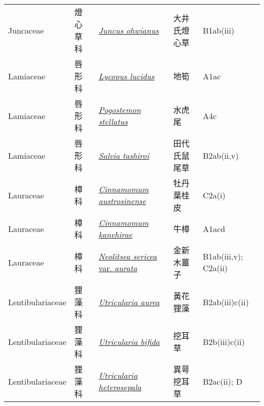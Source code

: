 {\begin{longtable}{p{2.5cm}p{2.5cm}p{4.5cm}p{2.5cm}p{3cm}}
    Juncaceae & 燈心草科 & \href{http://www.theplantlist.org/tpl1.1/search?q=Juncus+ohwianus}{\textit{Juncus ohwianus} } & 大井氏燈心草 & B1ab(iii) \index{Juncus@\textit{Juncus}!ohwianus@\textit{ohwianus}}  \index{大井氏燈心草} \\
    Lamiaceae & 唇形科 & \href{http://www.theplantlist.org/tpl1.1/search?q=Lycopus+lucidus}{\textit{Lycopus lucidus} } & 地筍 & A1ac \index{Lycopus@\textit{Lycopus}!lucidus@\textit{lucidus}}  \index{地筍} \\
    Lamiaceae & 唇形科 & \href{http://www.theplantlist.org/tpl1.1/search?q=Pogostemon+stellatus}{\textit{Pogostemon stellatus} } & 水虎尾 & A4c \index{Pogostemon@\textit{Pogostemon}!stellatus@\textit{stellatus}}  \index{水虎尾} \\
    Lamiaceae & 唇形科 & \href{http://www.theplantlist.org/tpl1.1/search?q=Salvia+tashiroi}{\textit{Salvia tashiroi} } & 田代氏鼠尾草 & B2ab(ii,v) \index{Salvia@\textit{Salvia}!tashiroi@\textit{tashiroi}}  \index{田代氏鼠尾草} \\
    Lauraceae & 樟科 & \href{http://www.theplantlist.org/tpl1.1/search?q=Cinnamomum+austrosinense}{\textit{Cinnamomum austrosinense} } & 牡丹葉桂皮 & C2a(i) \index{Cinnamomum@\textit{Cinnamomum}!austrosinense@\textit{austrosinense}}  \index{牡丹葉桂皮} \\
    Lauraceae & 樟科 & \href{http://www.theplantlist.org/tpl1.1/search?q=Cinnamomum+kanehirae}{\textit{Cinnamomum kanehirae} } & 牛樟 & A1acd \index{Cinnamomum@\textit{Cinnamomum}!kanehirae@\textit{kanehirae}}  \index{牛樟} \\
    Lauraceae & 樟科 & \href{http://www.theplantlist.org/tpl1.1/search?q=Neolitsea+sericea+var.+aurata}{\textit{Neolitsea sericea} var. \textit{aurata} } & 金新木薑子 & B1ab(iii,v); C2a(ii) \index{Neolitsea@\textit{Neolitsea}!sericea@\textit{sericea}!var. aurata@var. \textit{aurata}}  \index{金新木薑子} \\
    Lentibulariaceae & 狸藻科 & \href{http://www.theplantlist.org/tpl1.1/search?q=Utricularia+aurea}{\textit{Utricularia aurea} } & 黃花狸藻 & B2ab(iii)c(ii) \index{Utricularia@\textit{Utricularia}!aurea@\textit{aurea}}  \index{黃花狸藻} \\
    Lentibulariaceae & 狸藻科 & \href{http://www.theplantlist.org/tpl1.1/search?q=Utricularia+bifida}{\textit{Utricularia bifida} } & 挖耳草 & B2b(iii)c(ii) \index{Utricularia@\textit{Utricularia}!bifida@\textit{bifida}}  \index{挖耳草} \\
    Lentibulariaceae & 狸藻科 & \href{http://www.theplantlist.org/tpl1.1/search?q=Utricularia+heterosepala}{\textit{Utricularia heterosepala} } & 異萼挖耳草 & B2ac(ii); D \index{Utricularia@\textit{Utricularia}!heterosepala@\textit{heterosepala}}  \index{異萼挖耳草} \\

\end{longtable}}
